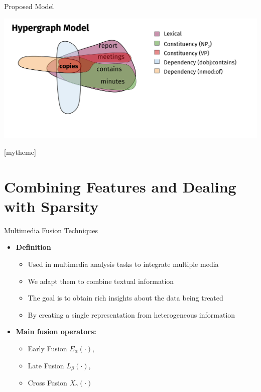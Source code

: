 \documentclass[10pt,=table]{beamer}
\begin{document}
\begin{frame}{Proposed Model}
\begin{overprint}
	\includegraphics[width=1\linewidth]{image2/Chapitre2/hyper_network_ex_5.pdf}%
	\end{overprint}
	\vspace{7cm}
\end{frame}


[mytheme]
\section[Contributions in Detail]{Combining Features and Dealing with Sparsity}                  

      
\begin{frame}{Multimedia Fusion Techniques}
\vfill
\begin{itemize}
\item<1-> \large \textbf{Definition}
	\begin{itemize}
	\item<1-> Used in multimedia analysis tasks to integrate multiple media 
	\item<1-> We adapt them to combine textual information

	\item<1-> The goal is to obtain rich insights about the data being treated
	\item<1-> By creating a single representation from heterogeneous information
	\end{itemize}									
\vfill	
\item<2-> \large\textbf{Main fusion operators:}
	\begin{itemize}
	\item<2-> Early Fusion $E_\alpha(\cdot)$, 
	\item<2-> Late Fusion $L_\beta(\cdot)$, 
	\item<2-> Cross Fusion $X_\gamma(\cdot)$
	\end{itemize}

\end{itemize}
\hfill
\end{frame}
\end{document}
